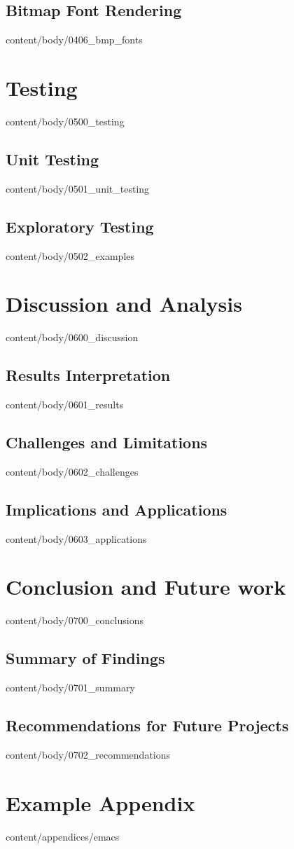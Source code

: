 \documentclass[english, tfg, loc, lof, covers, printable, firstnumbered, epsbased]{tfgtfmthesisuam}
\begin{document}
  \section{Bitmap Font Rendering}{content/body/0406_bmp_fonts}                      %

\chapter{Testing}{content/body/0500_testing}                                        %
  \section{Unit Testing}{content/body/0501_unit_testing}                            %
  \section{Exploratory Testing}{content/body/0502_examples}                         %

\chapter{Discussion and Analysis}{content/body/0600_discussion}                     %
  \section{Results Interpretation}{content/body/0601_results}                       %
  \section{Challenges and Limitations}{content/body/0602_challenges}                %
  \section{Implications and Applications}{content/body/0603_applications}           %
  
\chapter{Conclusion and Future work}{content/body/0700_conclusions}                 %
  \section{Summary of Findings}{content/body/0701_summary}                          %
  \section{Recommendations for Future Projects}{content/body/0702_recommendations}  %

\appendix

\chapter{Example Appendix}{content/appendices/emacs}
\end{document}

